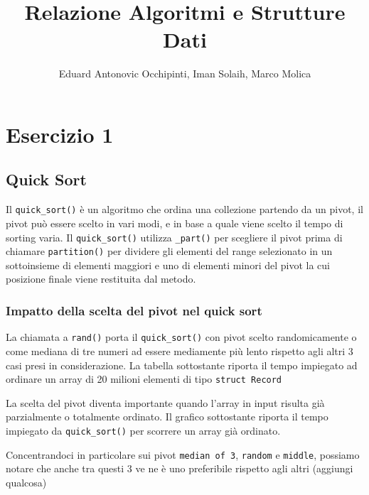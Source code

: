 \documentclass[12pt, letterpaper]{report}
\title{Relazione Algoritmi e Strutture Dati}
\author{Eduard Antonovic Occhipinti, Iman Solaih, Marco Molica}
\begin{document}
\maketitle
\tableofcontents

\chapter*{Esercizio 1}
\section{Quick Sort}
Il \verb|quick_sort()| è un algoritmo che ordina una collezione partendo da un pivot, 
il pivot può essere scelto in vari modi, e in base a quale viene scelto il tempo
di sorting varia. Il \verb|quick_sort()| utilizza \verb|_part()| per scegliere il pivot prima 
di chiamare \verb|partition()| per dividere gli elementi del range selezionato 
in un sottoinsieme di elementi maggiori e uno di elementi minori del pivot
la cui posizione finale viene restituita dal metodo.

\newpage
\subsection{Impatto della scelta del pivot nel quick sort}
La chiamata a \verb|rand()| porta il \verb|quick_sort()| con pivot scelto 
randomicamente o come mediana di tre numeri ad essere mediamente più lento 
rispetto agli altri 3 casi presi in considerazione. La tabella sottostante 
riporta il tempo impiegato ad ordinare un array di 20 milioni elementi di tipo \verb|struct Record|
\begin{figure}[H]
\centering
    
\end{figure}

\newpage
La scelta del pivot diventa importante quando l'array in input risulta già
parzialmente o totalmente ordinato.
Il grafico sottostante riporta il tempo impiegato da \verb|quick_sort()| 
per scorrere un array già ordinato.
\begin{figure}[H]
\centering
    
\end{figure}

\newpage
Concentrandoci in particolare sui pivot \verb|median of 3|, \verb|random| e \verb|middle|, 
possiamo notare che anche tra questi 3 ve ne è uno preferibile rispetto agli altri (aggiungi qualcosa)
\begin{figure}[H]
\centering
    
\end{figure}
\end{document}
